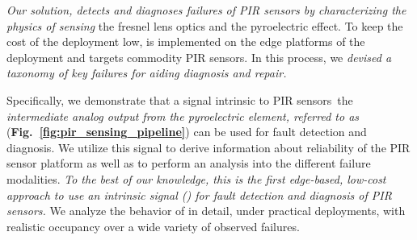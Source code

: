 \emph{Our solution, \sol detects and diagnoses failures of PIR sensors by characterizing the physics of sensing} \viz the fresnel lens optics and the pyroelectric effect. %
%
To keep the cost of the deployment low, \sol is implemented on the edge platforms of the deployment and targets commodity PIR sensors.
%
In this process, %
we \emph{devised a taxonomy of key failures for aiding diagnosis and repair.} 

Specifically, we demonstrate that a signal intrinsic to PIR sensors~\viz the \textit{intermediate analog output from the pyroelectric element, referred to as \aout} ({\bfseries Fig.~\ref{fig:pir_sensing_pipeline}}) can be used for %
fault detection and diagnosis. %
%
We utilize this signal to derive information about reliability of the PIR sensor platform as well as to perform an analysis into the different failure modalities. \textit{To the best of our knowledge, this is the first edge-based, low-cost approach to use an intrinsic signal (\aout) for fault detection and diagnosis of PIR sensors.} We analyze the behavior of \aout in detail, under %
practical deployments, with realistic occupancy
over a wide variety of observed failures. 


